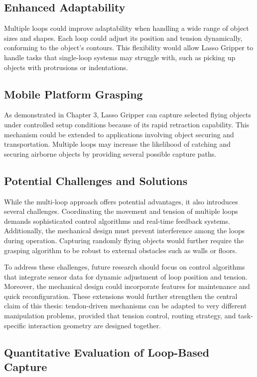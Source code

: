 \subsection{Enhanced Adaptability}
Multiple loops could improve adaptability when handling a wide range of object sizes and shapes. Each loop could adjust its position and tension dynamically, conforming to the object's contours. This flexibility would allow Lasso Gripper to handle tasks that single-loop systems may struggle with, such as picking up objects with protrusions or indentations.
\subsection{Mobile Platform Grasping}
As demonstrated in Chapter 3, Lasso Gripper can capture selected flying objects under controlled setup conditions because of its rapid retraction capability. This mechanism could be extended to applications involving object securing and transportation. Multiple loops may increase the likelihood of catching and securing airborne objects by providing several possible capture paths.
\subsection{Potential Challenges and Solutions}
While the multi-loop approach offers potential advantages, it also introduces several challenges. Coordinating the movement and tension of multiple loops demands sophisticated control algorithms and real-time feedback systems. Additionally, the mechanical design must prevent interference among the loops during operation. Capturing randomly flying objects would further require the grasping algorithm to be robust to external obstacles such as walls or floors.

To address these challenges, future research should focus on control algorithms that integrate sensor data for dynamic adjustment of loop position and tension. Moreover, the mechanical design could incorporate features for maintenance and quick reconfiguration. These extensions would further strengthen the central claim of this thesis: tendon-driven mechanisms can be adapted to very different manipulation problems, provided that tension control, routing strategy, and task-specific interaction geometry are designed together.

\subsection{Quantitative Evaluation of Loop-Based Capture}

